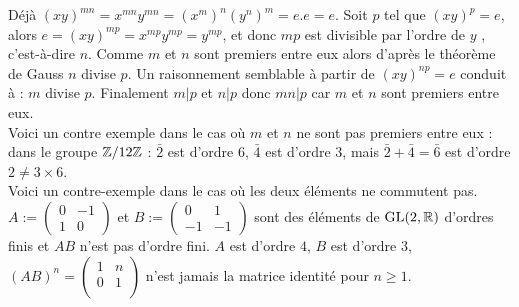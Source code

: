 \documentclass{magnolia}
\begin{document}
\begin{sol}
Déjà $(xy)^{mn} = x^{mn}y^{mn}= (x^m)^n(y^n)^m=e.e=e$. Soit $p$
tel que $(xy)^p = e$, alors $e= (xy)^{mp} = x^{mp}y^{mp}=y^{mp}$,
et donc $mp$ est divisible par l'ordre de $y$ , c'est-à-dire $n$.
Comme $m$ et $n$ sont premiers entre eux alors d'après le théorème
de Gauss $n$ divise $p$. Un raisonnement semblable à partir de
$(xy)^{np}=e$ conduit à : $m$ divise $p$. Finalement $m|p$ et
$n|p$ donc $mn|p$ car $m$ et $n$ sont premiers entre eux.\\
Voici un contre exemple dans le cas où $m$ et $n$ ne sont pas
premiers entre eux : dans le groupe $\mathbb{Z}/12\mathbb{Z}$ : $\bar{2}$ est
d'ordre $6$, $\bar{4}$ est d'ordre $3$, mais $\bar{2}+\bar{4} =
\bar{6}$ est d'ordre $2 \not= 3\times 6$.\\
Voici un contre-exemple dans le cas où les deux éléments ne commutent pas.
$A:=\left(\begin{smallmatrix} 0&-1\\1&0
\end{smallmatrix}\right)$ et $B:=\left(\begin{smallmatrix}
0&1\\-1&-1\end{smallmatrix}\right)$ sont des
\'el\'ements de $\text{GL}(2,\mathbb{R})$ d'ordres finis
et $AB$ n'est pas d'ordre fini. $A$ est d'ordre $4$, $B$ est d'ordre $3$, $(AB)^n =
\begin{pmatrix} 1&n\\0&1\\ \end{pmatrix}$ n'est jamais la matrice identité pour $n\geq 1$.
\end{sol}
\end{document}
